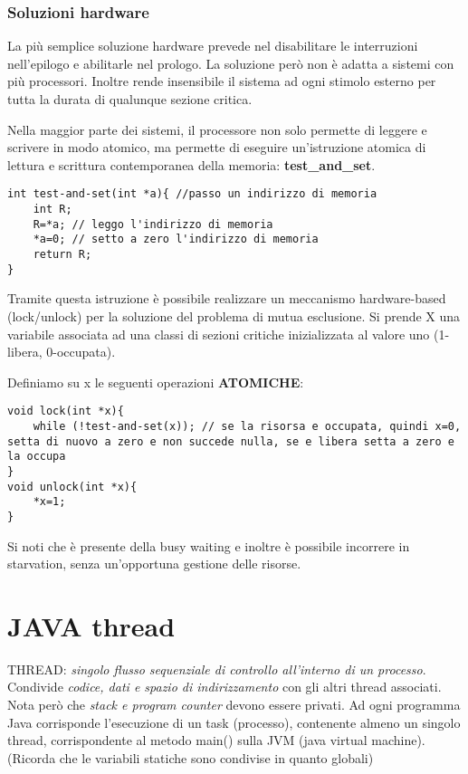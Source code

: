 \documentclass{article}
\begin{document}
\subsubsection{Soluzioni hardware}
\noindent La più semplice soluzione hardware prevede nel disabilitare le interruzioni nell'epilogo e abilitarle nel prologo.
La soluzione però non è adatta a sistemi con più processori. Inoltre rende insensibile il sistema ad ogni stimolo esterno per tutta
 la durata di qualunque sezione critica.
\medskip

\noindent Nella maggior parte dei sistemi, il processore non solo permette di leggere e scrivere in modo atomico, ma permette di eseguire
un'istruzione atomica di lettura e scrittura contemporanea della memoria: \textbf{test\_and\_set}.


\begin{lstlisting}[style=CStyle]
int test-and-set(int *a){ //passo un indirizzo di memoria
    int R;
    R=*a; // leggo l'indirizzo di memoria
    *a=0; // setto a zero l'indirizzo di memoria
    return R;
}
\end{lstlisting}


\noindent Tramite questa istruzione è possibile realizzare un meccanismo hardware-based (lock/unlock) per la soluzione del 
problema di mutua esclusione. Si prende X una variabile associata ad una classi di sezioni critiche inizializzata al valore uno (1-libera, 0-occupata).

\noindent Definiamo su x le seguenti operazioni \textbf{ATOMICHE}:

\begin{lstlisting}[style=CStyle]
void lock(int *x){ 
    while (!test-and-set(x)); // se la risorsa e occupata, quindi x=0, setta di nuovo a zero e non succede nulla, se e libera setta a zero e la occupa
}
void unlock(int *x){
    *x=1;
}
\end{lstlisting}

\noindent Si noti che è presente della busy waiting e inoltre è possibile incorrere in starvation, 
senza un'opportuna gestione delle risorse.
\pagebreak

\section{JAVA thread}
\noindent THREAD: \textit{singolo flusso sequenziale di controllo all'interno di un processo}. Condivide \textit{codice, dati e spazio di indirizzamento} con gli altri thread
associati. Nota però che   \textit{stack e program counter} devono essere privati. Ad ogni programma Java corrisponde l'esecuzione di un task (processo), contenente almeno un
singolo thread, corrispondente al metodo main() sulla JVM (java virtual machine). (Ricorda che le variabili statiche sono condivise in quanto globali)
\end{document}
